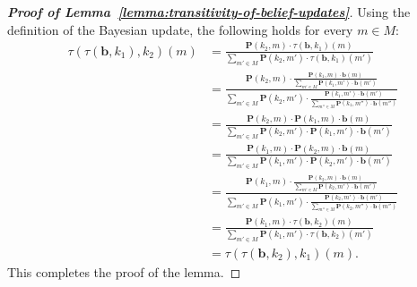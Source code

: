 \begin{proof}[\normalfont\bfseries Proof of Lemma~\ref{lemma:transitivity-of-belief-updates}]
 Using the definition of the Bayesian update, the following holds for every $m \in M$:
 \begin{align*}
   \tau(\tau(\mathbf{b}, k_1), k_2)(m) & = \frac{\mathbf{P}(k_2, m) \cdot \tau(\mathbf{b}, k_1)(m)}{\sum_{m' \in M} \mathbf{P}(k_2, m') \cdot \tau(\mathbf{b}, k_1)(m')} \\
   & = \frac{\mathbf{P}(k_2, m) \cdot \frac{\mathbf{P}(k_1, m) \cdot \mathbf{b}(m)}{\sum_{m' \in M} \mathbf{P}(k_1, m') \cdot \mathbf{b}(m')}}{\sum_{m' \in M} \mathbf{P}(k_2, m') \cdot \frac{\mathbf{P}(k_1, m') \cdot \mathbf{b}(m')}{\sum_{m'' \in M} \mathbf{P}(k_1, m'') \cdot \mathbf{b}(m'')}} \\
   & = \frac{\mathbf{P}(k_2, m) \cdot \mathbf{P}(k_1, m) \cdot \mathbf{b}(m)}{\sum_{m' \in M} \mathbf{P}(k_2, m') \cdot \mathbf{P}(k_1, m') \cdot \mathbf{b}(m')} \\
   & = \frac{\mathbf{P}(k_1, m) \cdot \mathbf{P}(k_2, m) \cdot \mathbf{b}(m)}{\sum_{m' \in M} \mathbf{P}(k_1, m') \cdot \mathbf{P}(k_2, m') \cdot \mathbf{b}(m')} \\
   & = \frac{\mathbf{P}(k_1, m) \cdot \frac{\mathbf{P}(k_2, m) \cdot \mathbf{b}(m)}{\sum_{m' \in M} \mathbf{P}(k_2, m') \cdot \mathbf{b}(m')}}{\sum_{m' \in M} \mathbf{P}(k_1, m') \cdot \frac{\mathbf{P}(k_2, m') \cdot \mathbf{b}(m')}{\sum_{m'' \in M} \mathbf{P}(k_2, m'') \cdot \mathbf{b}(m'')}} \\
   & = \frac{\mathbf{P}(k_1, m) \cdot \tau(\mathbf{b}, k_2)(m)}{\sum_{m' \in M} \mathbf{P}(k_1, m') \cdot \tau(\mathbf{b}, k_2)(m')} \\
   & = \tau(\tau(\mathbf{b}, k_2), k_1)(m).
 \end{align*}
This completes the proof of the lemma.
\end{proof}




